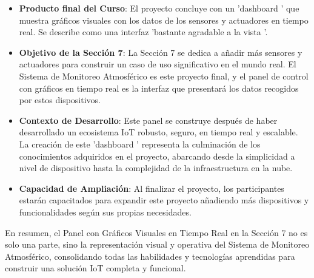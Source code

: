 \documentclass{report}
\begin{document}
\begin{itemize}
    \item \textbf{Producto final del Curso}: El proyecto concluye con un  'dashboard ' que muestra gráficos visuales con los datos de los sensores y actuadores 
    en tiempo real. Se describe como una interfaz  'bastante agradable a la vista '.
    \item \textbf{Objetivo de la Sección 7}: La Sección 7 se dedica a añadir más sensores y actuadores para construir un caso de uso significativo en el 
    mundo real. El Sistema de Monitoreo Atmosférico es este proyecto final, y el panel de control con gráficos en tiempo real es la interfaz que presentará 
    los datos recogidos por estos dispositivos.
    \item \textbf{Contexto de Desarrollo}: Este panel se construye después de haber desarrollado un ecosistema IoT robusto, seguro, en tiempo real y escalable. 
    La creación de este  'dashboard ' representa la culminación de los conocimientos adquiridos en el proyecto, abarcando desde la simplicidad a nivel de 
    dispositivo hasta la complejidad de la infraestructura en la nube.
    \item \textbf{Capacidad de Ampliación}: Al finalizar el proyecto, los participantes estarán capacitados para expandir este proyecto añadiendo más 
    dispositivos y funcionalidades según sus propias necesidades.
\end{itemize}
En resumen, el Panel con Gráficos Visuales en Tiempo Real en la Sección 7 no es solo una parte, sino la representación visual y operativa del Sistema de 
Monitoreo Atmosférico, consolidando todas las habilidades y tecnologías aprendidas para construir una solución IoT completa y funcional.
\end{document}
